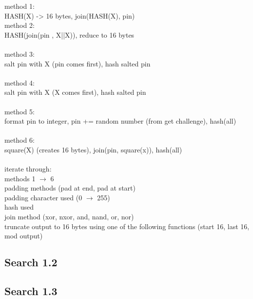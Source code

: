 \documentclass[bsc,frontabs,twoside,singlespacing,parskip,deptreport]{infthesis}     %
\begin{document}



method 1:\\
HASH(X) -> 16 bytes, join(HASH(X), pin)\\

method 2:\\
HASH(join(pin , X||X)), reduce to 16 bytes\\\\

method 3:\\
salt pin with X (pin comes first), hash salted pin\\\\

method 4:\\
salt pin with X (X comes first), hash salted pin\\\\

method 5:\\
format pin to integer, pin += random number (from get challenge), hash(all)\\\\

method 6:\\
square(X) (creates 16 bytes), join(pin, square(x)), hash(all)\\\\

iterate through:\\
methods 1 $\rightarrow$ 6\\
padding methods (pad at end, pad at start)\\
padding character used (0 $\rightarrow$ 255)\\
hash used\\
join method (xor, nxor, and, nand, or, nor)\\
truncate output to 16 bytes using one of the following functions (start 16, last 16, mod output)\\



\subsection{Search 1.2}
\subsection{Search 1.3}
\end{document}
